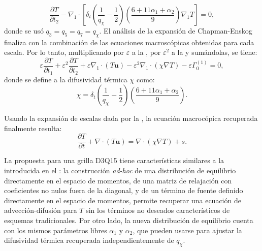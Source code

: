 \begin{equation}
	\dfrac{\partial T}{\partial t_2} - \nabla_1 \cdot \left[ \delta_t \left( \dfrac{1}{q_{\chi}} - \dfrac{1}{2} \right) \left( \dfrac{6 + 11\alpha_1+\alpha_2}{9} \right) \nabla_1 T \right] = 0,
	\label{eq:eps2_T_3d}
\end{equation}
donde se us\'o $q_3=q_5=q_7=q_{\chi}$. El an\'alisis de la expansi\'on de Chapman-Enskog finaliza con la combinaci\'on de las ecuaciones macrosc\'opicas obtenidas para cada escala. Por lo tanto, multiplicando por $\varepsilon$ a la , por $\varepsilon^2$ a la  y sum\'andolas, se tiene:
\begin{equation}
	\varepsilon \dfrac{\partial T}{\partial t_1} + \varepsilon^2 \dfrac{\partial T}{\partial t_2} + \varepsilon \nabla_1 \cdot (T\bm{u}) - \varepsilon^2 \nabla_1 \cdot (\chi \nabla T) - \varepsilon \Gamma_0^{(1)} = 0,
\end{equation}
donde se define a la difusividad t\'ermica $\chi$ como:
\begin{equation}
	\chi = \delta_t \left( \dfrac{1}{q_{\chi}} - \dfrac{1}{2} \right) \left( \dfrac{6 + 11\alpha_1+\alpha_2}{9} \right).
	\label{eq:modelo_3d_chi}
\end{equation}

Usando la expansi\'on de escalas dada por la , la ecuaci\'on macroc\'opica recuperada finalmente resulta:
\begin{equation}
	\dfrac{\partial T}{\partial t} + \nabla \cdot (T\bm{u}) = \nabla \cdot (\chi \nabla T) + s.
	\label{eq:T_3d}
\end{equation}

La \lbe{} propuesta para una grilla D3Q15 tiene caracter\'isticas similares a la introducida en el : la construcci\'on \emph{ad-hoc} de una distribuci\'on de equilibrio directamente en el espacio de momentos, de una matriz de relajaci\'on con coeficientes no nulos fuera de la diagonal, y de un t\'ermino de fuente definido directamente en el espacio de momentos, permite recuperar una ecuaci\'on de advecci\'on-difusi\'on para $T$ sin los t\'erminos no deseados caracter\'isticos de esquemas tradicionales. Por otro lado, la nueva distribuci\'on de equilibrio cuenta con los mismos par\'ametros libres $\alpha_1$ y $\alpha_2$, que pueden usarse para ajustar la difusividad t\'ermica recuperada independientemente de $q_{\chi}$.

